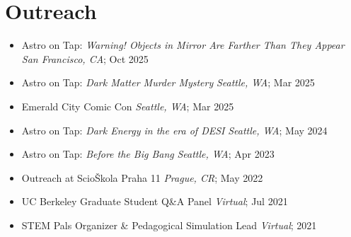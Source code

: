 \section{Outreach}
\begin{itemize}
    \item Astro on Tap: \textit{Warning! Objects in Mirror Are Farther Than They Appear} \hfill \textit{San Francisco, CA}; Oct 2025

    \item Astro on Tap: \textit{Dark Matter Murder Mystery} \hfill \textit{Seattle, WA}; Mar 2025

    \item Emerald City Comic Con \hfill \textit{Seattle, WA}; Mar 2025

    \item Astro on Tap: \textit{Dark Energy in the era of DESI} \hfill \textit{Seattle, WA}; May 2024

    \item Astro on Tap: \textit{Before the Big Bang} \hfill \textit{Seattle, WA}; Apr 2023

    \item Outreach at ScioŠkola Praha 11 \hfill \textit{Prague, CR}; May 2022

    \item UC Berkeley Graduate Student Q\&A Panel \hfill \textit{Virtual}; Jul 2021

    \item STEM Pals Organizer \& Pedagogical Simulation Lead \hfill \textit{Virtual}; 2021


\end{itemize}
